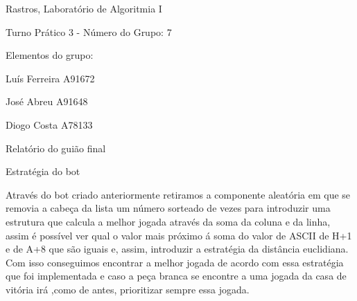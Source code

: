 Rastros, Laboratório de Algoritmia I

Turno Prático 3 -\/ Número do Grupo\+: 7

Elementos do grupo\+:

Luís Ferreira A91672

José Abreu A91648

Diogo Costa A78133

Relatório do guião final

Estratégia do bot

Através do bot criado anteriormente retiramos a componente aleatória em que se removia a cabeça da lista um número sorteado de vezes para introduzir uma estrutura que calcula a melhor jogada através da soma da coluna e da linha, assim é possível ver qual o valor mais próximo á soma do valor de A\+S\+C\+II de H+1 e de A+8 que são iguais e, assim, introduzir a estratégia da distância euclidiana. Com isso conseguimos encontrar a melhor jogada de acordo com essa estratégia que foi implementada e caso a peça branca se encontre a uma jogada da casa de vitória irá ,como de antes, prioritizar sempre essa jogada. 